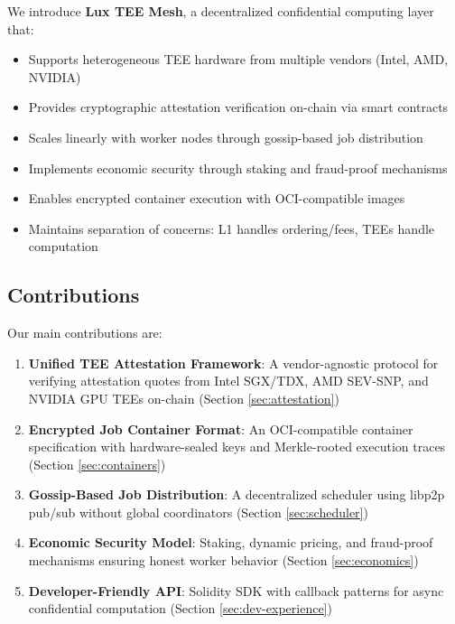 \documentclass[11pt,letterpaper]{article}
\begin{document}
We introduce \textbf{Lux TEE Mesh}, a decentralized confidential computing layer that:

\begin{itemize}
  \item Supports heterogeneous TEE hardware from multiple vendors (Intel, AMD, NVIDIA)
  \item Provides cryptographic attestation verification on-chain via smart contracts
  \item Scales linearly with worker nodes through gossip-based job distribution
  \item Implements economic security through staking and fraud-proof mechanisms
  \item Enables encrypted container execution with OCI-compatible images
  \item Maintains separation of concerns: L1 handles ordering/fees, TEEs handle computation
\end{itemize}

\subsection{Contributions}

Our main contributions are:

\begin{enumerate}
  \item \textbf{Unified TEE Attestation Framework}: A vendor-agnostic protocol for verifying attestation quotes from Intel SGX/TDX, AMD SEV-SNP, and NVIDIA GPU TEEs on-chain (Section \ref{sec:attestation})

  \item \textbf{Encrypted Job Container Format}: An OCI-compatible container specification with hardware-sealed keys and Merkle-rooted execution traces (Section \ref{sec:containers})

  \item \textbf{Gossip-Based Job Distribution}: A decentralized scheduler using libp2p pub/sub without global coordinators (Section \ref{sec:scheduler})

  \item \textbf{Economic Security Model}: Staking, dynamic pricing, and fraud-proof mechanisms ensuring honest worker behavior (Section \ref{sec:economics})

  \item \textbf{Developer-Friendly API}: Solidity SDK with callback patterns for async confidential computation (Section \ref{sec:dev-experience})
\end{enumerate}
\end{document}
